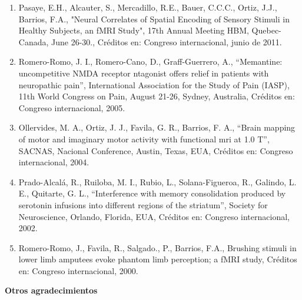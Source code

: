 \documentclass[12pt]{article}
\begin{document}
\begin{enumerate}
\item Pasaye, E.H., Alcauter, S., Mercadillo, R.E., Bauer, C.C.C., Ortiz, J.J., Barrios, F.A., "Neural Correlates of Spatial Encoding 
of 
Sensory Stimuli in Healthy Subjects, an fMRI Study", 17th Annual Meeting HBM, Quebec-Canada, June 26-30., Créditos en: Congreso 
internacional, junio de 2011.

\item Romero-Romo, J. I., Romero-Cano, D., Graff-Guerrero, A., “Memantine: uncompetitive NMDA receptor ntagonist offers relief in 
patients with neuropathic pain”, International Association for the Study of Pain (IASP), 11th World Congress on Pain, August 21-26, 
Sydney, Australia, Créditos en: Congreso internacional, 2005.

\item Ollervides, M. A., Ortiz, J. J., Favila, G. R., Barrios, F. A., “Brain mapping of motor and imaginary motor activity with 
functional mri at 1.0 T”, SACNAS, Nacional Conference, Austin, Texas, EUA, Créditos en: Congreso internacional, 2004.

\item Prado-Alcalá, R., Ruiloba, M. I., Rubio, L., Solana-Figueroa, R., Galindo, L. E., Quitarte, G. L., “Interference with memory 
consolidation produced by serotonin infusions into different regions of the striatum”, Society for Neuroscience, Orlando, Florida, EUA, 
Créditos en: Congreso internacional, 2002.

\item Romero-Romo, J., Favila, R., Salgado., P., Barrios, F.A., Brushing stimuli in lower limb amputees evoke phantom limb perception; 
a 
fMRI study, Créditos en: Congreso internacional, 2000.
\end{enumerate}

\textbf{Otros agradecimientos}
\end{document}
